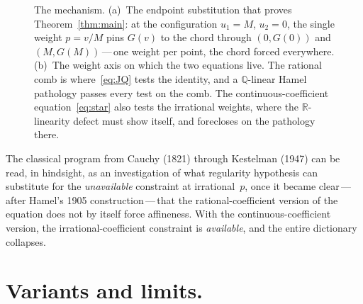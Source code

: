 \documentclass{article}
\theoremstyle{plain}
\theoremstyle{definition}
\newcommand{\R}{\mathbb{R}}
\newcommand{\Q}{\mathbb{Q}}
\begin{document}
\begin{figure}[ht]
{%
}
\caption{The mechanism. (a)~The endpoint substitution that proves
Theorem~\ref{thm:main}: at the configuration $u_1=M$, $u_2=0$, the
single weight $p=v/M$ pins $G(v)$ to the chord through $(0,G(0))$ and
$(M,G(M))$\,---\,one weight per point, the chord forced everywhere.
(b)~The weight axis on which the two equations live. The rational comb
is where~\eqref{eq:JQ} tests the identity, and a $\Q$-linear Hamel
pathology passes every test on the comb. The continuous-coefficient
equation~\eqref{eq:star} also tests the irrational weights, where the
$\R$-linearity defect must show itself, and forecloses on the
pathology there.}
\label{fig:mechanism}
\end{figure}

The classical program from Cauchy (1821) through Kestelman (1947)
can be read, in hindsight, as an investigation of what regularity
hypothesis can substitute for the \emph{unavailable} constraint at
irrational~$p$, once it became clear\,---\,after Hamel's 1905
construction\,---\,that the rational-coefficient version of the
equation does not by itself force affineness. With the
continuous-coefficient version, the irrational-coefficient constraint
is \emph{available}, and the entire dictionary collapses.

\section{Variants and limits.}
\label{sec:variants}
\end{document}
